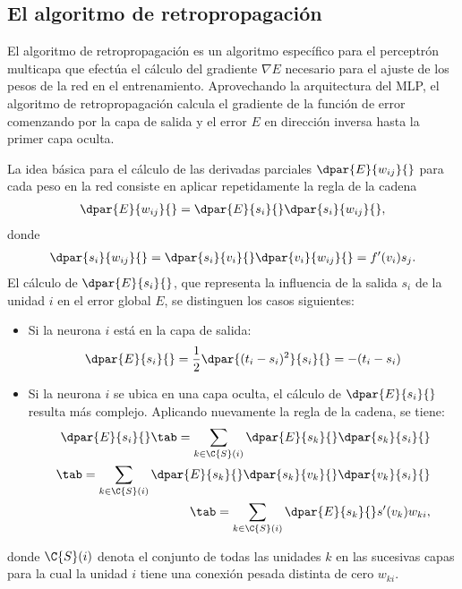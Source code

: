 %
%
\subsection{El algoritmo de retropropagación}
%
El algoritmo de retropropagación es un algoritmo específico para el
perceptrón multicapa que efectúa el cálculo del gradiente $\nabla E$
necesario para el ajuste de los pesos de la red en el entrenamiento.
Aprovechando la arquitectura del MLP, el algoritmo de retropropagación
calcula el gradiente de la función de error comenzando por la capa de
salida y  el error $E$ en dirección inversa hasta la
primer capa oculta.

La idea básica para el cálculo de las derivadas parciales
$\dpar{E}{w_{ij}}{}$ para cada peso en la red consiste en aplicar
repetidamente la regla de la cadena
%
\begin{align}\label{e2:deriv-E-wrt-w}
  \dpar{E}{w_{ij}}{} = \dpar{E}{s_{i}}{}\dpar{s_i}{w_{ij}}{},
\end{align}
%
donde
%
\begin{align}\label{e2:deriv-s-wrt-w}
  \dpar{s_i}{w_{ij}}{} = \dpar{s_i}{v_{i}}{}\dpar{v_i}{w_{ij}}{} =
  f'(v_i) s_j .
\end{align}
%
El cálculo de $\dpar{E}{s_i}{}$, que representa la influencia
de la salida $s_i$ de la unidad $i$ en el error global $E$,
se distinguen los casos siguientes:
%
\begin{itemize}
\item Si la neurona $i$ está en la capa de salida:
  \begin{align}\label{e2:deriv-E-wrt-s-out} %
    \dpar{E}{s_i}{}=\frac{1}{2}\dpar{(t_i-s_i)^2}{s_i}{}=-(t_i-s_i)
  \end{align}
\item Si la neurona $i$ se ubica en una capa oculta, el cálculo de
  $\dpar{E}{s_i}{}$ resulta más complejo. Aplicando nuevamente la
  regla de la cadena, se tiene:
  \begin{align}\label{e2:deriv-E-wrt-s-hid} %
    \dpar{E}{s_i}{} \tab= \sum_{k\in\C{S}(i)}
      \dpar{E}{s_k}{}\dpar{s_k}{s_i}{} \notag\\
    \tab= \sum_{k\in\C{S}(i)}
      \dpar{E}{s_k}{}\dpar{s_k}{v_k}{}\dpar{v_k}{s_i}{} \notag\\
    \tab= \sum_{k\in\C{S}(i)} \dpar{E}{s_k}{} s'(v_k) w_{ki},
  \end{align}
\end{itemize}
donde $\C{S}(i)$ denota el conjunto de todas las unidades $k$ en las
sucesivas capas para la cual la unidad $i$ tiene una conexión
pesada distinta de cero $w_{ki}$.

